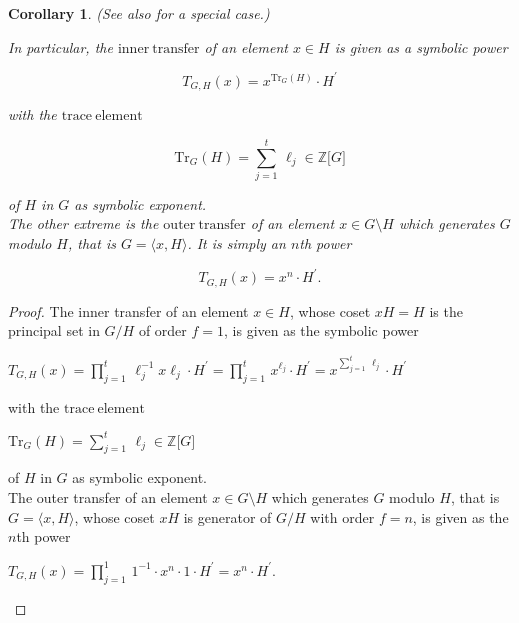 \documentclass{amsart}
\newtheorem{corollary}{Corollary}[section]
\theoremstyle{definition}
\numberwithin{equation}{section}
\begin{document}
\begin{corollary}
\label{cor:NrmSbg}
(See also
\cite[Lem.10.6, p.300]{Is}
for a special case.)

In particular,
the \(\mathrm{inner\ transfer}\) of an element \(x\in H\) is given as a symbolic power

\begin{equation}
\label{eqn:InnerTransfer}
T_{G,H}(x)=x^{\mathrm{Tr}_G(H)}\cdot H^\prime
\end{equation}

\noindent
with the \(\mathrm{trace\ element}\)

\begin{equation}
\label{eqn:TraceElement}
\mathrm{Tr}_G(H)=\sum_{j=1}^t\,\ell_j\in\mathbb{Z}\lbrack G\rbrack
\end{equation}

\noindent
of \(H\) in \(G\) as symbolic exponent.\\
The other extreme is the \(\mathrm{outer\ transfer}\) of an element \(x\in G\setminus H\) which generates \(G\) modulo \(H\),
that is \(G=\langle x,H\rangle\).
It is simply an \(n\)th power

\begin{equation}
\label{eqn:OuterTransfer}
T_{G,H}(x)=x^n\cdot H^\prime.
\end{equation}

\end{corollary}


\begin{proof}
The inner transfer of an element \(x\in H\),
whose coset \(xH=H\) is the principal set in \(G/H\) of order \(f=1\),
is given as the symbolic power

\begin{center}
\(T_{G,H}(x)=\prod_{j=1}^t\,\ell_j^{-1}x\ell_j\cdot H^\prime=\prod_{j=1}^t\,x^{\ell_j}\cdot H^\prime
=x^{\sum_{j=1}^t\,\ell_j}\cdot H^\prime\)
\end{center}

\noindent
with the \(\mathrm{trace\ element}\)

\begin{center}
\(\mathrm{Tr}_G(H)=\sum_{j=1}^t\,\ell_j\in\mathbb{Z}\lbrack G\rbrack\)
\end{center}

\noindent
of \(H\) in \(G\) as symbolic exponent.\\
The outer transfer of an element \(x\in G\setminus H\) which generates \(G\) modulo \(H\),
that is \(G=\langle x,H\rangle\),
whose coset \(xH\) is generator of \(G/H\) with order \(f=n\),
is given as the \(n\)th power

\begin{center}
\(T_{G,H}(x)=\prod_{j=1}^1\,1^{-1}\cdot x^n\cdot 1\cdot H^\prime=x^n\cdot H^\prime\).
\end{center}
\end{proof}
\end{document}

